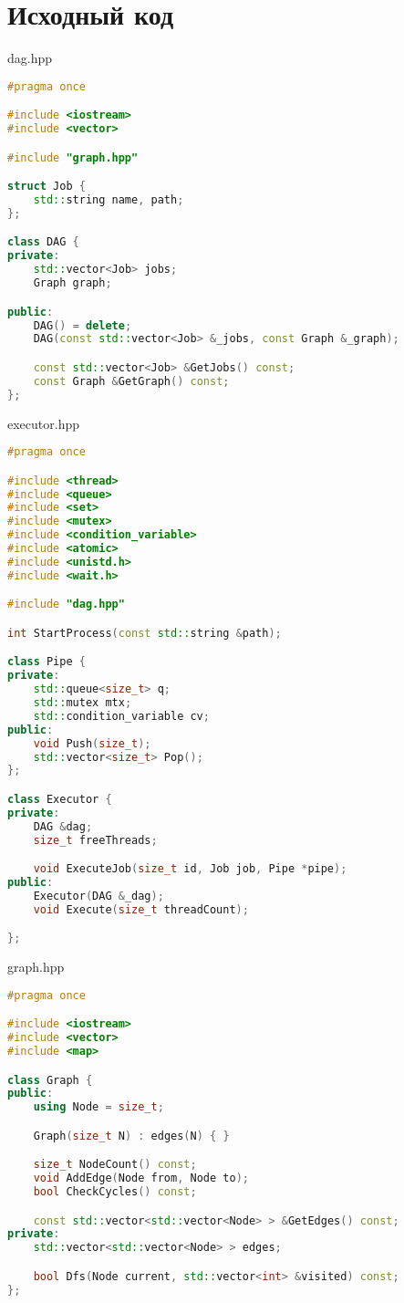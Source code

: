 \documentclass[a4paper, 12pt]{article}
\begin{document}
\newpage

\section{Исходный код}
dag.hpp
\begin{lstlisting}[language=C++]
#pragma once

#include <iostream>
#include <vector>

#include "graph.hpp"

struct Job {
    std::string name, path;
};

class DAG {
private:
    std::vector<Job> jobs;
    Graph graph;

public:
    DAG() = delete;
    DAG(const std::vector<Job> &_jobs, const Graph &_graph);

    const std::vector<Job> &GetJobs() const;
    const Graph &GetGraph() const;
};
\end{lstlisting}

executor.hpp
\begin{lstlisting}[language=C++]
#pragma once

#include <thread>
#include <queue>
#include <set>
#include <mutex>
#include <condition_variable>
#include <atomic>
#include <unistd.h>
#include <wait.h>

#include "dag.hpp"

int StartProcess(const std::string &path);

class Pipe {
private:
    std::queue<size_t> q;
    std::mutex mtx;
    std::condition_variable cv;
public:
    void Push(size_t);
    std::vector<size_t> Pop();
};

class Executor {
private:
    DAG &dag;
    size_t freeThreads;

    void ExecuteJob(size_t id, Job job, Pipe *pipe);
public:
    Executor(DAG &_dag);
    void Execute(size_t threadCount);

};
\end{lstlisting}

graph.hpp
\begin{lstlisting}[language=C++]
#pragma once

#include <iostream>
#include <vector>
#include <map>

class Graph {
public:
    using Node = size_t;

    Graph(size_t N) : edges(N) { }

    size_t NodeCount() const;
    void AddEdge(Node from, Node to);
    bool CheckCycles() const;

    const std::vector<std::vector<Node> > &GetEdges() const;
private:
    std::vector<std::vector<Node> > edges;

    bool Dfs(Node current, std::vector<int> &visited) const;
};
\end{lstlisting}
\end{document}
